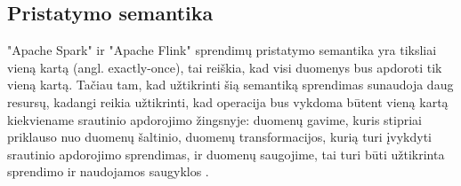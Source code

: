 \documentclass{VUMIFPSbakalaurinis}
\begin{document}
\subsection{Pristatymo semantika}
"Apache Spark" ir "Apache Flink" sprendimų pristatymo semantika yra tiksliai vieną kartą (angl. exactly-once), tai reiškia, kad visi duomenys bus apdoroti tik vieną kartą. Tačiau tam, kad užtikrinti šią semantiką sprendimas sunaudoja daug resursų, kadangi reikia užtikrinti, kad operacija bus vykdoma būtent vieną kartą kiekviename srautinio apdorojimo žingsnyje: duomenų gavime, kuris stipriai priklauso nuo duomenų šaltinio, duomenų transformacijos, kurią turi įvykdyti srautinio apdorojimo sprendimas, ir duomenų saugojime, tai turi būti užtikrinta sprendimo ir naudojamos saugyklos \cite{zhang20}.\par
\end{document}

